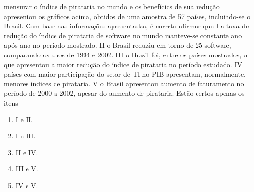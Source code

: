 \documentclass{exam}
\begin{document}
\begin{questions}
mensurar o índice de pirataria no mundo e os benefícios de sua
redução apresentou os gráficos acima, obtidos de uma amostra
de 57 países, incluindo-se o Brasil.
Com base nas informações apresentadas, é correto afirmar que
I a taxa de redução do índice de pirataria de software no mundo
manteve-se constante ano após ano no período mostrado.
II o Brasil reduziu em torno de 25%
software, comparando os anos de 1994 e 2002.
III o Brasil foi, entre os países mostrados, o que apresentou a maior
redução do índice de pirataria no período estudado.
IV países com maior participação do setor de TI no PIB apresentam,
normalmente, menores índices de pirataria.
V o Brasil apresentou aumento de faturamento no período de 2000
a 2002, apesar do aumento de pirataria.
Estão certos apenas os itens
	\begin{enumerate}[label=\alph*)]
		\item  I e II. 
		\item  I e III. 
		\item  II e IV.
		\item  III e V.
		\item  IV e V.

	\end{enumerate}


\end{questions}
\end{document}
